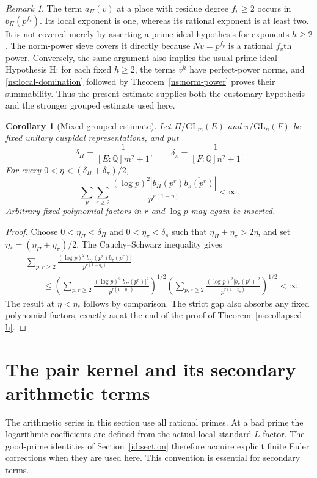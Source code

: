 \documentclass[11pt,reqno]{amsart}
\numberwithin{equation}{section}
\newtheorem{corollary}[theorem]{Corollary}
\theoremstyle{definition}
\theoremstyle{remark}
\newtheorem{remark}[theorem]{Remark}
\newcommand{\Q}{\mathbb Q}
\begin{document}
\begin{remark}\label{ns:residue-degree-warning}
The term $a_\Pi(v)$ at a place with residue degree $f_v\ge2$ occurs in $b_\Pi(p^{f_v})$. Its local exponent is one, whereas its rational exponent is at least two. It is not covered merely by asserting a prime-ideal hypothesis for exponents $h\ge2$. The norm-power sieve covers it directly because $Nv=p^{f_v}$ is a rational $f_v$th power. Conversely, the same argument also implies the usual prime-ideal Hypothesis H: for each fixed $h\ge2$, the terms $v^h$ have perfect-power norms, and \eqref{ns:local-domination} followed by Theorem~\ref{ns:norm-power} proves their summability. Thus the present estimate supplies both the customary hypothesis and the stronger grouped estimate used here.
\end{remark}

\begin{corollary}[Mixed grouped estimate]\label{ns:mixed-h}
Let $\Pi/\mathrm{GL}_m(E)$ and $\pi/\mathrm{GL}_{n}(F)$ be fixed unitary cuspidal representations, and put
\[
\delta_\Pi=\frac1{[E:\Q]m^2+1},\qquad
\delta_\pi=\frac1{[F:\Q]n^2+1}.
\]
For every $0<\eta<(\delta_\Pi+\delta_\pi)/2$,
\begin{equation}\label{ns:mixed-h-bound}
\sum_p\sum_{r\ge2}
\frac{(\log p)^2|b_\Pi(p^r)\overline{b_\pi(p^r)}|}
     {p^{r(1-\eta)}}<\infty.
\end{equation}
Arbitrary fixed polynomial factors in $r$ and $\log p$ may again be inserted.
\end{corollary}
\begin{proof}
Choose $0<\eta_\Pi<\delta_\Pi$ and $0<\eta_\pi<\delta_\pi$ such that
$\eta_\Pi+\eta_\pi>2\eta$, and set $\eta_*=(\eta_\Pi+\eta_\pi)/2$. The Cauchy--Schwarz inequality gives
\begin{align*}
&\sum_{p,r\ge2}\frac{(\log p)^2|b_\Pi(p^r)b_\pi(p^r)|}{p^{r(1-\eta_*)}}\\
&\qquad\le
\left(\sum_{p,r\ge2}\frac{(\log p)^2|b_\Pi(p^r)|^2}{p^{r(1-\eta_\Pi)}}\right)^{1/2}
\left(\sum_{p,r\ge2}\frac{(\log p)^2|b_\pi(p^r)|^2}{p^{r(1-\eta_\pi)}}\right)^{1/2}<\infty.
\end{align*}
The result at $\eta<\eta_*$ follows by comparison. The strict gap also absorbs any fixed polynomial factors, exactly as at the end of the proof of Theorem~\ref{ns:collapsed-h}.
\end{proof}


\section{The pair kernel and its secondary arithmetic terms}\label{pa:section}
The arithmetic series in this section use all rational primes. At a bad prime the logarithmic coefficients are defined from the actual local standard $L$-factor. The good-prime identities of Section~\ref{id:section} therefore acquire explicit finite Euler corrections when they are used here. This convention is essential for secondary terms.
\end{document}
